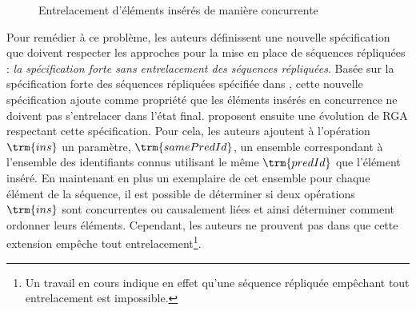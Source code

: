 \begin{itemize}
\begin{figure}[!ht]
{
      }
      \caption{Entrelacement d'éléments insérés de manière concurrente}
      \label{fig:rga-interleaving}
    \end{figure}
    Pour remédier à ce problème, les auteurs définissent une nouvelle spécification que doivent respecter les approches pour la mise en place de séquences répliquées : \emph{la spécification forte sans entrelacement des séquences répliquées}.
    Basée sur la spécification forte des séquences répliquées spécifiée dans \cite{10.1145/2933057.2933090, ATTIYA2021141}, cette nouvelle spécification ajoute comme propriété que les éléments insérés en concurrence ne doivent pas s'entrelacer dans l'état final.
    \citeauthor{2019-interleaving-anomalies-collaborative-editors-kleppmann} proposent ensuite une évolution de \ac{RGA} respectant cette spécification.
    Pour cela, les auteurs ajoutent à l'opération $\trm{ins}$ un paramètre, $\trm{samePredId}$, un ensemble correspondant à l'ensemble des identifiants connus utilisant le même $\trm{predId}$ que l'élément inséré.
    En maintenant en plus un exemplaire de cet ensemble pour chaque élément de la séquence, il est possible de déterminer si deux opérations $\trm{ins}$ sont concurrentes ou causalement liées et ainsi déterminer comment ordonner leurs éléments.
    Cependant, les auteurs ne prouvent pas dans \cite{2019-interleaving-anomalies-collaborative-editors-kleppmann} que cette extension empêche tout entrelacement\footnote{Un travail en cours \cite{2022-no-doubly-non-interleaving-crdts-weidner} indique en effet qu'une séquence répliquée empêchant tout entrelacement est impossible.}.
\end{itemize}
